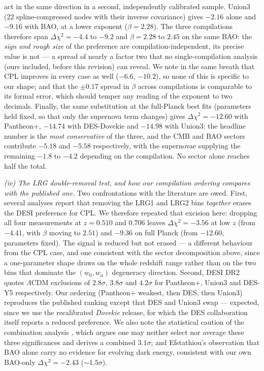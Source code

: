 \documentclass[11pt]{article}
\begin{document}
act in the same direction in a second, independently calibrated sample. Union3 (22 spline-compressed
nodes with their inverse covariance) gives $-2.16$ alone and $-9.16$ with BAO, at a lower exponent
($\beta = 2.28$). The three compilations therefore span $\Delta\chi^2 = -4.4$ to $-9.2$ and
$\beta = 2.28$ to $2.45$ on the same BAO: the \emph{sign and rough size} of the preference are
compilation-independent, its precise value is not --- a spread of nearly a factor two that no
single-compilation analysis (ours included, before this revision) can reveal. We note in the same
breath that CPL improves in every case as well ($-6.6$, $-10.2$), so none of this is specific to
our shape; and that the $\pm 0.17$ spread in $\beta$ across compilations is comparable to its
formal error, which should temper any reading of the exponent to two decimals. Finally, the same
substitution at the full-Planck best fits (parameters held fixed, so that only the supernova term
changes) gives $\Delta\chi^2 = -12.60$ with Pantheon+, $-14.74$ with DES-Dovekie and $-14.98$ with
Union3: the headline number is the \emph{most conservative} of the three, and the CMB and BAO
sectors contribute $-5.18$ and $-5.58$ respectively, with the supernovae supplying the remaining
$-1.8$ to $-4.2$ depending on the compilation. No sector alone reaches half the total.

\emph{(iv) The LRG double-removal test, and how our compilation ordering compares with the
published one.} Two confrontations with the literature are owed. First, several analyses report
that removing the LRG1 and LRG2 bins \emph{together} erases the DESI preference for CPL. We
therefore repeated that excision here: dropping all four measurements at $z = 0.510$ and $0.706$
leaves $\Delta\chi^2 = -3.56$ at low $z$ (from $-4.41$, with $\beta$ moving to $2.51$) and $-9.36$
on full Planck (from $-12.60$, parameters fixed). The signal is reduced but not erased --- a
different behaviour from the CPL case, and one consistent with the sector decomposition above,
since a one-parameter shape draws on the whole redshift range rather than on the two bins that
dominate the $(w_0, w_a)$ degeneracy direction. Second, DESI DR2 quotes $\Lambda$CDM exclusions
of $2.8\sigma$, $3.8\sigma$ and $4.2\sigma$ for Pantheon+, Union3 and DES-Y5 respectively. Our
ordering (Pantheon+ weakest, then DES, then Union3) reproduces the published ranking except that
DES and Union3 swap --- expected, since we use the recalibrated \emph{Dovekie} release, for which
the DES collaboration itself reports a reduced preference. We also note the statistical caution of
the combination analysis \cite{Art15336}, which argues one may neither select nor average these
three significances and derives a combined $3.1\sigma$; and Efstathiou's observation that BAO alone
carry no evidence for evolving dark energy, consistent with our own BAO-only $\Delta\chi^2 = -2.43$
($\sim 1.5\sigma$).
\end{document}
